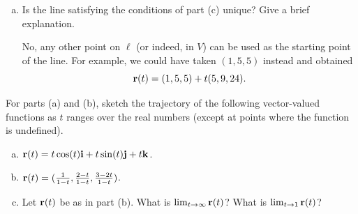\begin{problem}
\begin{enumerate}[(a)]
\begin{solution}
\begin{center}
      \end{center}
    \end{solution}
    \item Is the line satisfying the conditions of part (c) unique? Give a brief explanation.
    \begin{solution}
      No, any other point on $\ell$ (or indeed, in $V$) can be used as the starting point of the line. For example, we could have taken $(1,5,5)$ instead and obtained
      \[\mathbf r(t)=(1,5,5)+t(5,9,24).\]
    \end{solution}
  \end{enumerate}
\end{problem}

\begin{problem}
  For parts (a) and (b), sketch the trajectory of the following vector-valued functions as $t$ ranges over the real numbers (except at points where the function is undefined).
  \begin{enumerate}[(a)]
    \item $\mathbf r(t)=t\cos(t)\mathbf i+t\sin(t)\mathbf j+t\mathbf k$.
    \begin{solution}
      \begin{center}
      \end{center}
    \end{solution}
    \item $\mathbf r(t)=(\frac 1{1-t},\frac{2-t}{1-t},\frac{3-2t}{1-t})$.
    \begin{solution}
      \begin{center}
      \end{center}
    \end{solution}
    \item Let $\mathbf r(t)$ be as in part (b). What is $\lim_{t\to \infty}\mathbf r(t)$? What is $\lim_{t\to 1}\mathbf r(t)$?

\end{enumerate}
\end{problem}
